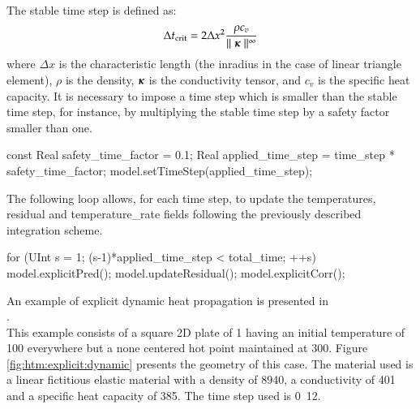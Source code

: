 The stable time step is defined as:
\begin{equation}\label{eqn:htm:explicit:stabletime}
  \Delta t_{{\mathrm{crit}}} = 2 \Delta x^2 \frac{\rho c_v}{\mid\mid \boldsymbol{\kappa} \mid\mid^\infty}
\end{equation}
where $\Delta  x$ is the characteristic length (\eg  the inradius in the  case of
linear triangle  element), $\rho$ is the density, $\boldsymbol{\kappa}$ is the conductivity tensor,
and $c_v$ is the specific heat capacity. It is
necessary to impose a time step which is smaller than the stable time step, for
instance, by  multiplying the stable time  step by a safety  factor smaller than
one.

\begin{cpp}
  const Real safety_time_factor = 0.1;
  Real applied_time_step = time_step * safety_time_factor;
  model.setTimeStep(applied_time_step);
\end{cpp}


The following loop  allows, for each time  step, to update the  temperatures, residual and
temperature\_rate  fields  following the previously described integration scheme.

\begin{cpp}
  for (UInt s = 1; (s-1)*applied_time_step < total_time; ++s) {
    model.explicitPred();
    model.updateResidual();
    model.explicitCorr();  
  }
\end{cpp}

An    example    of    explicit     dynamic    heat propagation is    presented    in \\
.  \\
This example  consists of a square 2D plate of \unit{1}{\squaremetre} 
having an initial temperature of \unit{100}{\kelvin} everywhere but a none centered hot point 
maintained at \unit{300}{\kelvin}. Figure \ref{fig:htm:explicit:dynamic} presents the
geometry of this case. The material used is a linear fictitious elastic material
with  a density  of  \unit{8940}{\kilogrampercubicmetre}, a  conductivity of 
\unit{401}{\watt\per\metre\per\kelvin} and a specific heat capacity of \unit{385}{\joule\per\kelvin\per\kilogram}. The time step used is \unit{0.12}{\second}.

